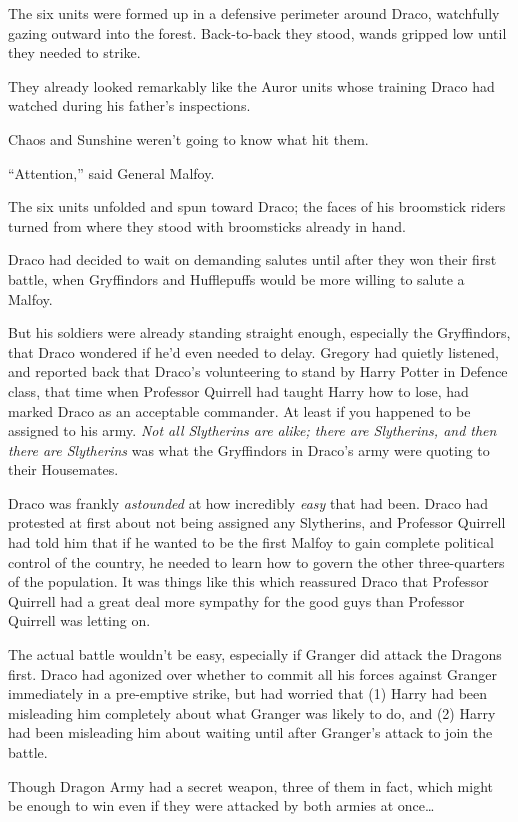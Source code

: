 The six units were formed up in a defensive perimeter around Draco, watchfully gazing outward into the forest. Back-to-back they stood, wands gripped low until they needed to strike.

They already looked remarkably like the Auror units whose training Draco had watched during his father’s inspections.

Chaos and Sunshine weren’t going to know what hit them.

“Attention,” said General Malfoy.

The six units unfolded and spun toward Draco; the faces of his broomstick riders turned from where they stood with broomsticks already in hand.

Draco had decided to wait on demanding salutes until after they won their first battle, when Gryffindors and Hufflepuffs would be more willing to salute a Malfoy.

But his soldiers were already standing straight enough, especially the Gryffindors, that Draco wondered if he’d even needed to delay. Gregory had quietly listened, and reported back that Draco’s volunteering to stand by Harry Potter in Defence class, that time when Professor Quirrell had taught Harry how to lose, had marked Draco as an acceptable commander. At least if you happened to be assigned to his army. \emph{Not all Slytherins are alike; there are Slytherins, and then there are Slytherins} was what the Gryffindors in Draco’s army were quoting to their Housemates.

Draco was frankly \emph{astounded} at how incredibly \emph{easy} that had been. Draco had protested at first about not being assigned any Slytherins, and Professor Quirrell had told him that if he wanted to be the first Malfoy to gain complete political control of the country, he needed to learn how to govern the other three-quarters of the population. It was things like this which reassured Draco that Professor Quirrell had a great deal more sympathy for the good guys than Professor Quirrell was letting on.

The actual battle wouldn’t be easy, especially if Granger did attack the Dragons first. Draco had agonized over whether to commit all his forces against Granger immediately in a pre-emptive strike, but had worried that (1) Harry had been misleading him completely about what Granger was likely to do, and (2) Harry had been misleading him about waiting until after Granger’s attack to join the battle.

Though Dragon Army had a secret weapon, three of them in fact, which might be enough to win even if they were attacked by both armies at once…

